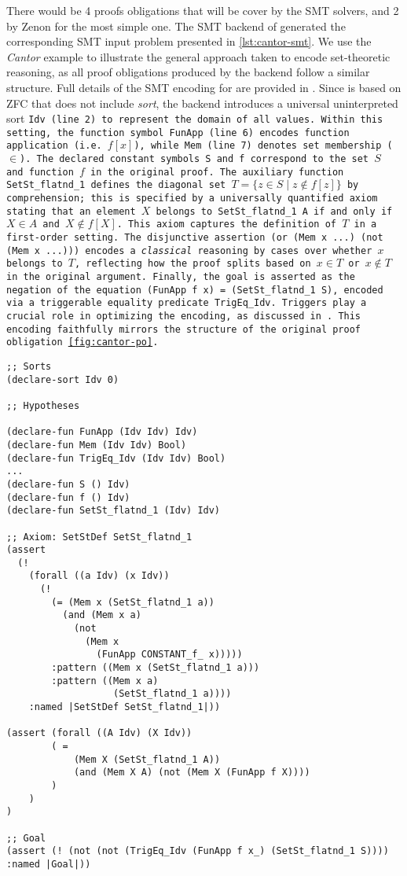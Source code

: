 There would be 4 proofs obligations that will be cover by the SMT solvers, and 2 by Zenon for the most simple one. 
The SMT backend of \tlaplus generated the corresponding SMT input problem presented in \cref{lst:cantor-smt}.
We use the \textit{Cantor} example to illustrate the general approach taken to encode set-theoretic reasoning, as all proof obligations produced by the backend follow a similar structure.
Full details of the SMT encoding for \tlaplus are provided in \cite{new-encoding-tlaps}.
Since \tlaplus is based on ZFC that does not include \emph{sort}, the backend introduces a universal uninterpreted sort \tt{Idv} (line 2) to represent the domain of all values.
Within this setting, the function symbol \tt{FunApp} (line 6) encodes function application (i.e. $f[x]$), while \tt{Mem} (line 7) denotes set membership ($\in$).
The declared constant symbols \tt{S} and \tt{f} correspond to the set $S$ and function $f$ in the original proof.
The auxiliary function \tt{SetSt\_flatnd\_1} defines the diagonal set $T = \{ z \in S \mid z \notin f[z] \}$ by comprehension; this is specified by a universally quantified axiom stating that an element $X$ belongs to \tt{SetSt\_flatnd\_1 A} if and only if $X \in A$ and $X \notin f[X]$.
This axiom captures the definition of $T$ in a first-order setting.
The disjunctive assertion \tt{(or (Mem x ...) (not (Mem x ...)))} encodes a \emph{classical} reasoning by cases over whether $x$ belongs to $T$, reflecting how the proof splits based on $x \in T$ or $x \notin T$ in the original \tlaplus argument. 
Finally, the goal is asserted as the negation of the equation \tt{(FunApp f x) = (SetSt\_flatnd\_1 S)}, encoded via a triggerable equality predicate \tt{TrigEq\_Idv}.
Triggers play a crucial role in optimizing the encoding, as discussed in \cite[\S3]{new-encoding-tlaps}.
This encoding faithfully mirrors the structure of the original \tlaplus proof obligation \cref{fig:cantor-po}.

\smallskip

\begin{lstlisting}[language=SMT, caption={Proof obligation of step $\ps{1}{6.}$ in Cantor theorem},label={lst:cantor-smt}]
;; Sorts
(declare-sort Idv 0)

;; Hypotheses

(declare-fun FunApp (Idv Idv) Idv)
(declare-fun Mem (Idv Idv) Bool)
(declare-fun TrigEq_Idv (Idv Idv) Bool)
...
(declare-fun S () Idv)
(declare-fun f () Idv)
(declare-fun SetSt_flatnd_1 (Idv) Idv)

;; Axiom: SetStDef SetSt_flatnd_1
(assert
  (!
    (forall ((a Idv) (x Idv))
      (!
        (= (Mem x (SetSt_flatnd_1 a))
          (and (Mem x a)
            (not
              (Mem x
                (FunApp CONSTANT_f_ x)))))
        :pattern ((Mem x (SetSt_flatnd_1 a)))
        :pattern ((Mem x a)
                   (SetSt_flatnd_1 a))))
    :named |SetStDef SetSt_flatnd_1|))

(assert (forall ((A Idv) (X Idv))
        ( = 
            (Mem X (SetSt_flatnd_1 A))
            (and (Mem X A) (not (Mem X (FunApp f X))))
        )
    )
)

;; Goal
(assert (! (not (not (TrigEq_Idv (FunApp f x_) (SetSt_flatnd_1 S)))) :named |Goal|))
\end{lstlisting}

